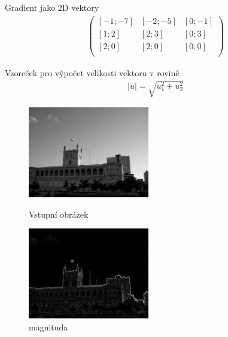 \documentclass{report}
\begin{document}
Gradient jako 2D vektory
\begin{align}
	\label{gradient_vektory} 
		\begin{pmatrix} 
			[-1 ; -7] & [-2 ; -5] & [0 ; -1] \\
			[1 ; 2] & [2 ; 3] & [0 ; 3] \\
			[2 ; 0] & [2 ; 0] & [0 ; 0] \\
		\end{pmatrix}		   
\end{align}

Vzoreček pro výpočet velikosti vektoru v rovině
\begin{align}
   \label{velikost_vektoru} |u| = \sqrt{u_1^2 + u_2^2}
\end{align}

\begin{figure}[htp]
	\centering
	\begin{minipage}[c]{150pt}
		\centering
		\includegraphics[width=150pt]{./img/vstupni_obraz.jpg}
		\caption{Vstupní obrázek}
	\end{minipage}
	\begin{minipage}[c]{150pt}
		\includegraphics[width=150pt]{./img/magnitude.png}
		\caption{magnituda}
		\centering
	\end{minipage}
\end{figure}
\end{document}
